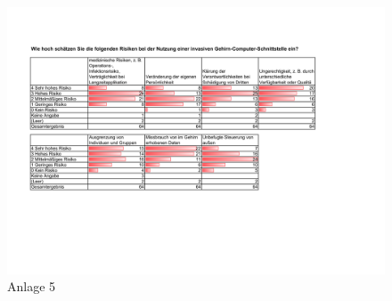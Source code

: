 \documentclass[11pt,ngerman,parskip=half]{scrartcl}
\begin{document}
\begin{appendices}
  \begin{figure}[H]
    \centering
    \includegraphics[width=\textwidth,height=\textheight,keepaspectratio]{src/img/kathrin-a5.png}
    \caption{Anlage 5}
  \end{figure}

\end{appendices}
\end{document}
